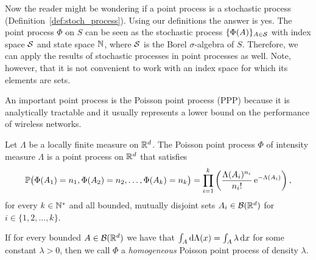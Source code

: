 \begin{note} \label{note:pp_sp}
    Now the reader might be wondering if a point process is a stochastic process (Definition~\ref{def:stoch_process}).
    Using our definitions the answer is yes.
    The point process $\Phi$ on $S$ can be seen as the stochastic process $\{\Phi(A)\}_{A\in\cal S}$ with index space $\cal S$ and state space $\N$, where $\cal S$ is the Borel $\sigma$-algebra of $S$.
    Therefore, we can apply the results of stochastic processes in point processes as well.
    Note, however, that it is not convenient to work with an index space for which its elements are sets.
\end{note}

An important point process is the Poisson point process (PPP) because it is analytically tractable and it usually represents a lower bound on the performance of wireless networks. %
%
\begin{definition}
    Let $\Lambda$ be a locally finite measure on $\R^d$.
    The Poisson point process $\Phi$ of intensity measure $\Lambda$ is a point process on $\R^d$ that satisfies
    \begin{align*}
        \P\big(\Phi(A_1)=n_1,\Phi(A_2)=n_2,\dots,\Phi(A_k)=n_k\big) = \prod_{i=1}^k \left( \frac{\Lambda(A_i)^{n_i}}{n_i!} \,\euler^{-\Lambda(A_i)} \right),
    \end{align*}
    for every $k\in\N^*$ and all bounded, mutually disjoint sets $A_i\in\cal{B}(\R^d)$ for $i\in\{1,2,\dots,k\}$.
    
    If for every bounded $A\in\cal{B}(\R^d)$ we have that $\int_A \d\Lambda(x) = \int_A \lambda\,\d x$ for some constant $\lambda > 0$, then we call $\Phi$ a \textit{homogeneous} Poisson point process of density $\lambda$.
\end{definition}

